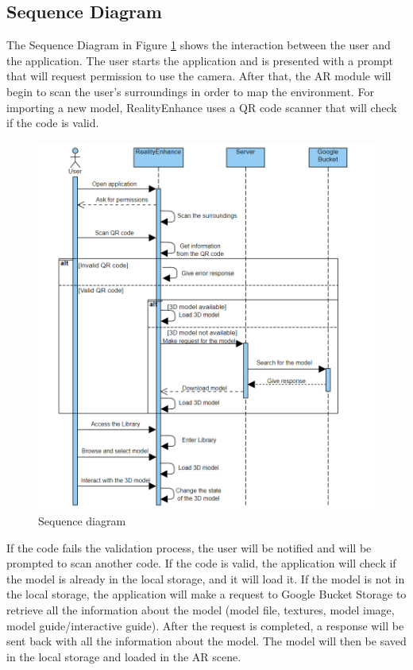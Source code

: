 \subsection*{Sequence Diagram}
The Sequence Diagram in Figure \ref{fig:SequenceDiagram} shows the interaction between the user and the application. The user starts the application and is presented with a prompt that will request permission to use the camera. After that, the \ac{AR} module will begin to scan the user's surroundings in order to map the environment. For importing a new model, RealityEnhance uses a \ac{QR} code scanner that will check if the code is valid.
\begin{figure}[ht]
    \centering
    \includegraphics[width=1\textwidth]{img/SequenceDiagram.png}
    \caption{Sequence diagram}
    \label{fig:SequenceDiagram}
\end{figure}
\newpage

If the code fails the validation process, the user will be notified and will be prompted to scan another code. If the code is valid, the application will check if the model is already in the local storage, and it will load it. If the model is not in the local storage, the application will make a request to Google Bucket Storage to retrieve all the information about the model (model file, textures, model image, model guide/interactive guide). After the request is completed, a response will be sent back with all the information about the model. The model will then be saved in the local storage and loaded in the \ac{AR} scene.

